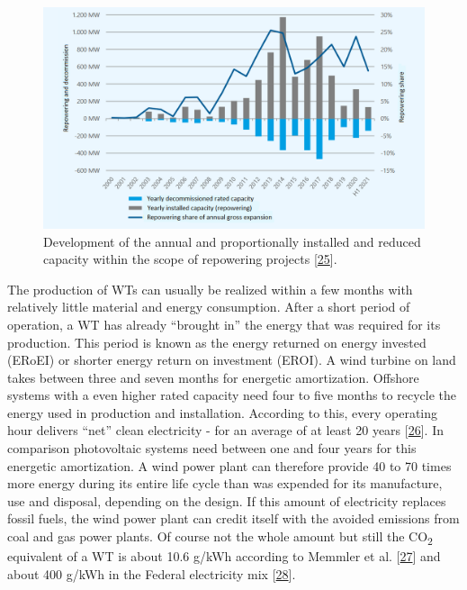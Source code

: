 \documentclass[a4paper,11pt]{article}
\begin{document}
\begin{figure}

{\centering \includegraphics[width=1\linewidth]{figures/repowering} 

}

\caption{Development of the annual and proportionally installed and reduced capacity within the scope of repowering projects {[}\protect\hyperlink{ref-DeutscheWindGuard.2021}{25}{]}.}\label{fig:repowering}
\end{figure}
The production of WTs can usually be realized within a few months with relatively little material and energy consumption. After a short period of operation, a WT has already ``brought in'' the energy that was required for its production. This period is known as the energy returned on energy invested (ERoEI) or shorter energy return on investment (EROI). A wind turbine on land takes between three and seven months for energetic amortization. Offshore systems with a even higher rated capacity need four to five months to recycle the energy used in production and installation. According to this, every operating hour delivers ``net'' clean electricity - for an average of at least 20 years {[}\protect\hyperlink{ref-PriyanaRazdan.2019}{26}{]}. In comparison photovoltaic systems need between one and four years for this energetic amortization. A wind power plant can therefore provide 40 to 70 times more energy during its entire life cycle than was expended for its manufacture, use and disposal, depending on the design. If this amount of electricity replaces fossil fuels, the wind power plant can credit itself with the avoided emissions from coal and gas power plants. Of course not the whole amount but still the CO\textsubscript{2} equivalent of a WT is about 10.6 g/kWh according to Memmler et al. {[}\protect\hyperlink{ref-M.MemmlerDr.T.LaufS.Schneider.2017}{27}{]} and about 400 g/kWh in the Federal electricity mix {[}\protect\hyperlink{ref-Umweltbundesamt.2021}{28}{]}.
\end{document}
